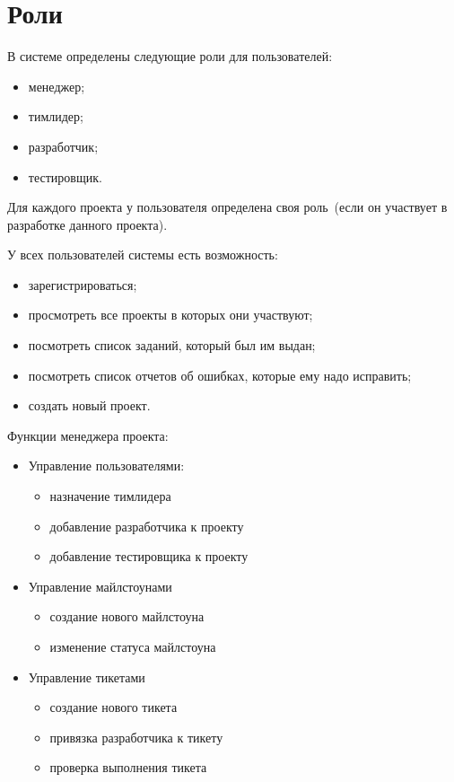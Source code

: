 \section{Роли}
В системе определены следующие роли для пользователей:
\begin{itemize}
	\item менеджер;
	\item тимлидер;
	\item разработчик;
	\item тестировщик.
\end{itemize}

Для каждого проекта у пользователя определена своя роль~(если он участвует в разработке данного проекта).

У всех пользователей системы есть возможность:
\begin{itemize}
	\item зарегистрироваться;
	\item просмотреть все проекты в которых они участвуют;
	\item посмотреть список заданий, который был им выдан;
	\item посмотреть список отчетов об ошибках, которые ему надо исправить;
	\item создать новый проект.
\end{itemize}

Функции менеджера проекта:
\begin{itemize}
	\item Управление пользователями:
	\begin{itemize}
		\item назначение тимлидера
		\item добавление разработчика к проекту
		\item добавление тестировщика к проекту
	\end{itemize}
	
	\item Управление майлстоунами
	\begin{itemize}
		\item создание нового майлстоуна
		\item изменение статуса майлстоуна
	\end{itemize}
	
	\item Управление тикетами
	\begin{itemize}
		\item создание нового тикета
		\item привязка разработчика к тикету
		\item проверка выполнения тикета
	\end{itemize}
\end{itemize}

